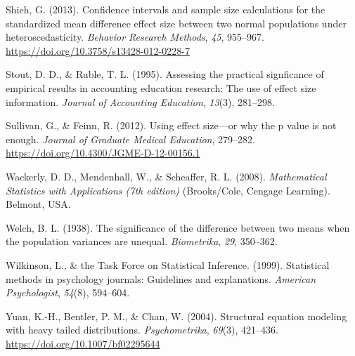 \documentclass[
  english,
  man,floatsintext]{apa6}
\begin{document}
\leavevmode\hypertarget{ref-Shieh_2013}{}%
Shieh, G. (2013). Confidence intervals and sample size calculations for the standardized mean difference effect size between two normal populations under heteroscedasticity. \emph{Behavior Research Methods}, \emph{45}, 955--967. \url{https://doi.org/10.3758/s13428-012-0228-7}

\leavevmode\hypertarget{ref-Stout_Ruble_1995}{}%
Stout, D. D., \& Ruble, T. L. (1995). Assessing the practical signficance of empirical results in accounting education research: The use of effect size information. \emph{Journal of Accounting Education}, \emph{13}(3), 281--298.

\leavevmode\hypertarget{ref-Sullivan_Feinn_2012}{}%
Sullivan, G., \& Feinn, R. (2012). Using effect size---or why the p value is not enough. \emph{Journal of Graduate Medical Education}, 279--282. \url{https://doi.org/10.4300/JGME-D-12-00156.1}

\leavevmode\hypertarget{ref-Wackerly_et_al_2008}{}%
Wackerly, D. D., Mendenhall, W., \& Scheaffer, R. L. (2008). \emph{Mathematical Statistics with Applications (7th edition)} (Brooks/Cole, Cengage Learning). Belmont, USA.

\leavevmode\hypertarget{ref-Welch_1938}{}%
Welch, B. L. (1938). The significance of the difference between two means when the population variances are unequal. \emph{Biometrika}, \emph{29}, 350--362.

\leavevmode\hypertarget{ref-Wilkinson_1999}{}%
Wilkinson, L., \& the Task Force on Statistical Inference. (1999). Statistical methods in psychology journals: Guidelines and explanations. \emph{American Psychologist}, \emph{54}(8), 594--604.

\leavevmode\hypertarget{ref-Yuan_et_al_2004}{}%
Yuan, K.-H., Bentler, P. M., \& Chan, W. (2004). Structural equation modeling with heavy tailed distributions. \emph{Psychometrika}, \emph{69}(3), 421--436. \url{https://doi.org/10.1007/bf02295644}

\endgroup


\clearpage
\makeatletter
\efloat@restorefloats
\makeatother
\end{document}

